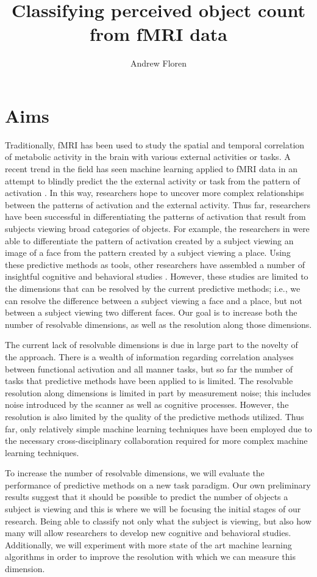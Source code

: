\documentclass[12pt]{article}
\title{Classifying perceived object count from fMRI data}
\author{Andrew Floren}
\date{}
\begin{document}
\maketitle{}

\section{Aims}
Traditionally, fMRI has been used to study the spatial and temporal correlation of metabolic activity in the brain with various external activities or tasks.
A recent trend in the field has seen machine learning applied to fMRI data in an attempt to blindly predict the the external activity or task from the pattern of activation \cite{Haxby2001,b,c}.
In this way, researchers hope to uncover more complex relationships between the patterns of activation and the external activity.
Thus far, researchers have been successful in differentiating the patterns of activation that result from subjects viewing broad categories of objects.
For example, the researchers in \cite{Haxby2001} were able to differentiate the pattern of activation created by a subject viewing an image of a face from the pattern created by a subject viewing a place.
Using these predictive methods as tools, other researchers have assembled a number of insightful cognitive and behavioral studies \cite{d,e,f}.
However, these studies are limited to the dimensions that can be resolved by the current predictive methods; i.e., we can resolve the difference between a subject viewing a face and a place, but not between a subject viewing two different faces.
Our goal is to increase both the number of resolvable dimensions, as well as the resolution along those dimensions.

The current lack of resolvable dimensions is due in large part to the novelty of the approach.
There is a wealth of information regarding correlation analyses between functional activation and all manner tasks, but so far the number of tasks that predictive methods have been applied to is limited.
The resolvable resolution along dimensions is limited in part by measurement noise; this includes noise introduced by the scanner as well as cognitive processes.
However, the resolution is also limited by the quality of the predictive methods utilized.
Thus far, only relatively simple machine learning techniques have been employed due to the necessary cross-disciplinary collaboration required for more complex machine learning techniques.

To increase the number of resolvable dimensions, we will evaluate the performance of predictive methods on a new task paradigm.
Our own preliminary results suggest that it should be possible to predict the number of objects a subject is viewing and this is where we will be focusing the initial stages of our research.
Being able to classify not only what the subject is viewing, but also how many will allow researchers to develop new cognitive and behavioral studies. 
Additionally, we will experiment with more state of the art machine learning algorithms in order to improve the resolution with which we can measure this dimension.
\end{document}
